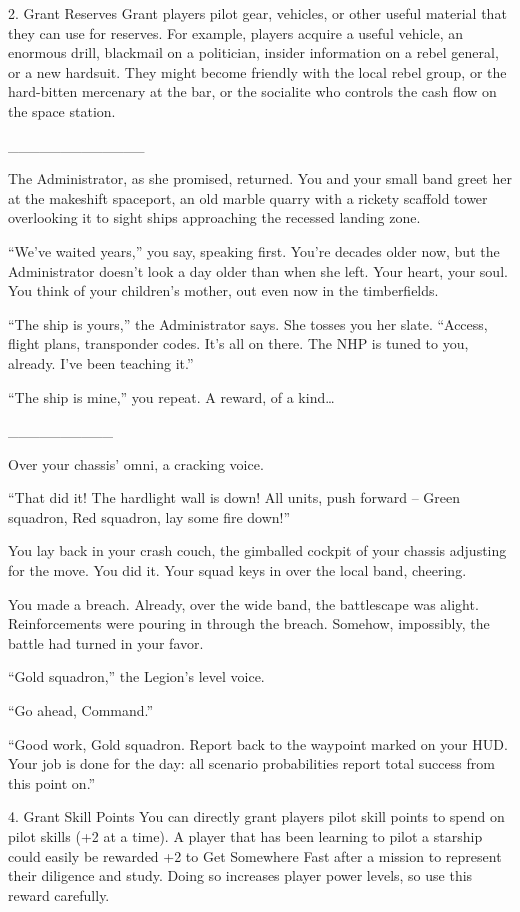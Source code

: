 2. Grant Reserves
Grant players pilot gear, vehicles, or other useful material that they can use for reserves. For
example, players acquire a useful vehicle, an enormous drill, blackmail on a politician, insider
information on a rebel general, or a new hardsuit. They might become friendly with the local rebel
group, or the hard-bitten mercenary at the bar, or the socialite who controls the cash flow on the
space station.


\_\_\_\_\_\_\_\_\_\_\_\_\_


The Administrator, as she promised, returned. You and your small band greet her at the makeshift
spaceport, an old marble quarry with a rickety scaffold tower overlooking it to sight ships
approaching the recessed landing zone.

“We’ve waited years,” you say, speaking first. You’re decades older now, but the Administrator
doesn’t look a day older than when she left. Your heart, your soul. You think of your children’s
mother, out even now in the timberfields.

“The ship is yours,” the Administrator says. She tosses you her slate. “Access, flight plans,
transponder codes. It’s all on there. The NHP is tuned to you, already. I’ve been teaching it.”

“The ship is mine,” you repeat. A reward, of a kind…

\_\_\_\_\_\_\_\_\_\_


Over your chassis’ omni, a cracking voice.

“That did it! The hardlight wall is down! All units, push forward -- Green squadron, Red squadron,
lay some fire down!”




You lay back in your crash couch, the gimballed cockpit of your chassis adjusting for the move.
You did it. Your squad keys in over the local band, cheering.

You made a breach. Already, over the wide band, the battlescape was alight. Reinforcements
were pouring in through the breach. Somehow, impossibly, the battle had turned in your favor.

“Gold squadron,” the Legion’s level voice.

“Go ahead, Command.”

“Good work, Gold squadron. Report back to the waypoint marked on your HUD. Your job is done
for the day: all scenario probabilities report total success from this point on.”


4. Grant Skill Points
You can directly grant players pilot skill points to spend on pilot skills (+2 at a time). A player that
has been learning to pilot a starship could easily be rewarded +2 to Get Somewhere Fast after a
mission to represent their diligence and study. Doing so increases player power levels, so use
this reward carefully.


